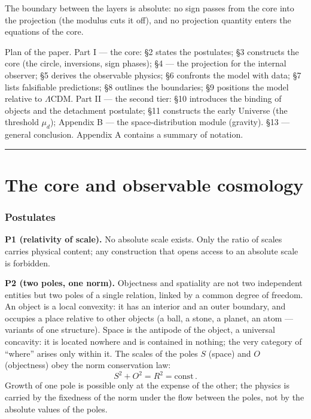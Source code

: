 \documentclass{article}
\begin{document}
The boundary between the layers is absolute: no sign passes from the core into the projection (the modulus cuts it off), and no projection quantity enters the equations of the core.

Plan of the paper. Part I --- the core: \S2 states the postulates; \S3 constructs the core (the circle, inversions, sign phases); \S4 --- the projection for the internal observer; \S5 derives the observable physics; \S6 confronts the model with data; \S7 lists falsifiable predictions; \S8 outlines the boundaries; \S9 positions the model relative to $\Lambda$CDM. Part II --- the second tier: \S10 introduces the binding of objects and the detachment postulate; \S11 constructs the early Universe (the threshold $\mu_d$); Appendix B --- the space-distribution module (gravity). \S13 --- general conclusion. Appendix A contains a summary of notation.

\bigskip
\hrule
\bigskip

\part{The core and observable cosmology}
\section{Postulates}

\noindent\textbf{P1 (relativity of scale).} No absolute scale exists. Only the ratio of scales carries physical content; any construction that opens access to an absolute scale is forbidden.

\medskip
\noindent\textbf{P2 (two poles, one norm).} Objectness and spatiality are not two independent entities but two poles of a single relation, linked by a common degree of freedom. An object is a local convexity: it has an interior and an outer boundary, and occupies a place relative to other objects (a ball, a stone, a planet, an atom --- variants of one structure). Space is the antipode of the object, a universal concavity: it is located nowhere and is contained in nothing; the very category of ``where'' arises only within it. The scales of the poles $S$ (space) and $O$ (objectness) obey the norm conservation law:
\begin{equation}
S^2 + O^2 = R^2 = \text{const}\,.
\end{equation}
Growth of one pole is possible only at the expense of the other; the physics is carried by the fixedness of the norm under the flow between the poles, not by the absolute values of the poles.
\end{document}

